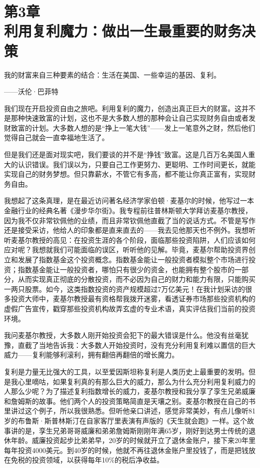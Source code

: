 
\section[第3章\q 利用复利魔力：做出一生最重要的财务决策]{第3章\\ 利用复利魔力：做出一生最重要的财务决策}

\begin{BookQuote}
我的财富来自三种要素的结合：生活在美国、一些幸运的基因、复利。

\hfill ——沃伦·巴菲特
\end{BookQuote}

我们现在开启投资自由之旅吧。利用复利的魔力，创造出真正巨大的财富。这并不是那种快速致富的计划，这也不是大多数人想的那种会让自己实现财务自由或者发财致富的计划。大多数人想的是“挣上一笔大钱”——发上一笔意外之财，然后他们觉得自己就会一直幸福地生活了。

但是我们还是面对现实吧，我们要谈的并不是“挣钱”致富。这是几百万名美国人重大的认识错误。我们误以为，只要自己工作更努力、更聪明、工作时间更长，就能实现自己的财务梦想。但只靠薪水，不管它有多高，都不能让你真正富有，实现财务自由。

我想起了这条真理，是在最近访问著名经济学家伯顿·麦基尔的时候，他写过一本金融行业的经典名著《漫步华尔街》。我专程前往普林斯顿大学拜访麦基尔教授，因为我不仅非常钦佩他的业绩，而且非常钦佩他直截了当的说话方式。不管是写作还是接受采访，他给人的印象都是直来直去的——我去见他那天也不例外。我想听听麦基尔教授的高见：在投资生涯的各个阶段，面临那些投资陷阱，人们应该如何应对呢？我想就我们可能面临的误区，听听他的见解。毕竟，麦基尔帮助投资界创立和发展了指数基金这个投资概念。指数基金能让一般投资者模拟整个市场进行投资；指数基金能让一般投资者，哪怕只有很少的资金，也能拥有整个股市的一部分，从而实现真正彻底的分散投资，而不必因为自己的财力和能力有限，只能购买一两只股票。如今，这类指数投资的资产规模超过7万亿美元！在我计划采访的很多投资大师中，麦基尔教授最有资格帮我拨开迷雾，看透证券市场那些投资机构的虚假广告宣传，戳穿那些投资机构故弄玄虚的专业术语，真实评估我们当前的投资环境。

我问麦基尔教授，大多数人刚开始投资会犯下的最大错误是什么。他没有丝毫犹豫，直截了当地告诉我：大多数人开始投资时，没有充分利用复利难以置信的巨大威力——复利能够利滚利，拥有翻倍再翻倍的增长魔力。

复利是力量无比强大的工具，以至爱因斯坦称复利是人类历史上最重要的发明。但是我心里嘀咕，如果复利真的有那么巨大的威力，那么为什么充分利用复利威力的人那么少呢？为了描述复利指数增长的威力，麦基尔教授和我分享了孪生兄弟威廉和詹姆斯的故事。他们两个人的投资策略简直是天壤之别。麦基尔教授在自己的书里讲过这个例子，所以我很熟悉。但听他亲口讲述，感觉非常美妙，有点儿像听81岁的布鲁斯·斯普林斯汀在自家客厅里表演有声版的《天生就会跑》一样。这个故事讲的是，孪生兄弟哥哥威廉和弟弟詹姆斯刚刚年满65岁，刚好到达男士传统的退休年龄。威廉投资起步比弟弟早，20岁的时候就开立了退休金账户，接下来20年里每年投资4000美元。到40岁的时候，他就不再往退休金账户里投钱了，而是把钱放在免税的投资领域，以获得每年10\%的税后净收益。

